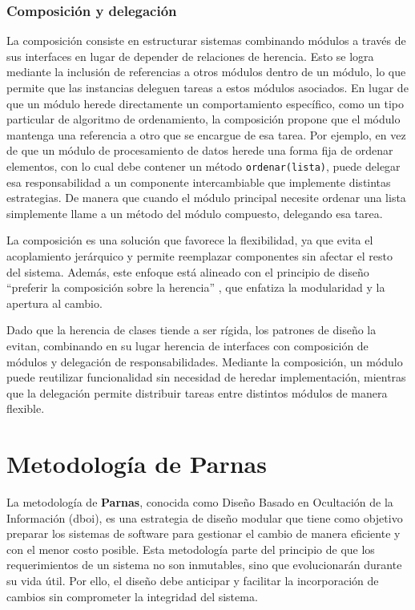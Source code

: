 \subsubsection*{Composición y delegación}
La composición consiste en estructurar sistemas combinando módulos a través de sus interfaces en lugar de depender de relaciones de herencia. Esto se logra mediante la inclusión de referencias a otros módulos dentro de un módulo, lo que permite que las instancias deleguen tareas a estos módulos asociados. En lugar de que un módulo herede directamente un comportamiento específico, como un tipo particular de algoritmo de ordenamiento, la composición propone que el módulo mantenga una referencia a otro que se encargue de esa tarea. Por ejemplo, en vez de que un módulo de procesamiento de datos herede una forma fija de ordenar elementos, con lo cual debe contener un método \verb|ordenar(lista)|, puede delegar esa responsabilidad a un componente intercambiable que implemente distintas estrategias. De manera que cuando el módulo principal necesite ordenar una lista simplemente llame a un método del módulo compuesto, delegando esa tarea.

 La composición es una solución que favorece la flexibilidad, ya que evita el acoplamiento jerárquico y permite reemplazar componentes sin afectar el resto del sistema. Además, este enfoque está alineado con el principio de diseño ``preferir la composición sobre la herencia'' \cite{Gamma:1995:DPE:186897}, que enfatiza la modularidad y la apertura al cambio.

Dado que la herencia de clases tiende a ser rígida, los patrones de diseño la evitan, combinando en su lugar herencia de interfaces con composición de módulos y delegación de responsabilidades. Mediante la composición, un módulo puede reutilizar funcionalidad sin necesidad de heredar implementación, mientras que la delegación permite distribuir tareas entre distintos módulos de manera flexible.


\section{Metodología de Parnas}
\label{metoParnas}

La metodología de \textbf{Parnas}\cite{Parnas1972}, conocida como Diseño Basado en Ocultación de la Información (\gls{dboi}), es una estrategia de diseño modular que tiene como objetivo preparar los sistemas de software para gestionar el cambio de manera eficiente y con el menor costo posible. Esta metodología parte del principio de que los requerimientos de un sistema no son inmutables, sino que evolucionarán durante su vida útil. Por ello, el diseño debe anticipar y facilitar la incorporación de cambios sin comprometer la integridad del sistema.


